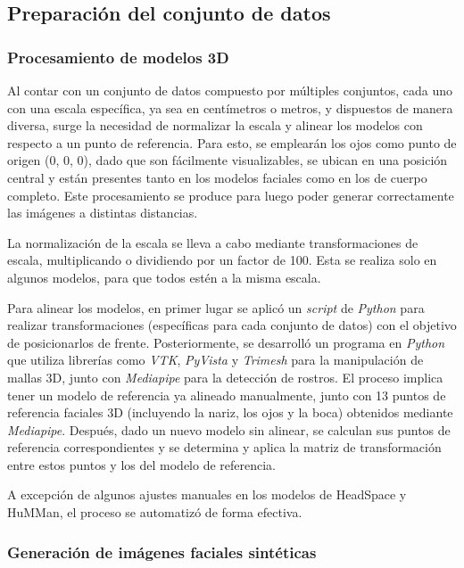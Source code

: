 \subsection{Preparación del conjunto de datos}

\subsubsection{Procesamiento de modelos 3D}

Al contar con un conjunto de datos compuesto por múltiples conjuntos, cada uno con una escala específica, ya sea en centímetros o metros, y dispuestos de manera diversa, surge la necesidad de normalizar la escala y alinear los modelos con respecto a un punto de referencia. Para esto, se emplearán los ojos como punto de origen (0, 0, 0), dado que son fácilmente visualizables, se ubican en una posición central y están presentes tanto en los modelos faciales como en los de cuerpo completo. Este procesamiento se produce para luego poder generar correctamente las imágenes a distintas distancias.

La normalización de la escala se lleva a cabo mediante transformaciones de escala, multiplicando o dividiendo por un factor de 100. Esta se realiza solo en algunos modelos, para que todos estén a la misma escala.

Para alinear los modelos, en primer lugar se aplicó un \textit{script} de \textit{Python} para realizar transformaciones (específicas para cada conjunto de datos) con el objetivo de posicionarlos de frente. Posteriormente, se desarrolló un programa en \textit{Python} que utiliza librerías como \textit{VTK}, \textit{PyVista} y \textit{Trimesh} para la manipulación de mallas 3D, junto con \textit{Mediapipe} para la detección de rostros. El proceso implica tener un modelo de referencia ya alineado manualmente, junto con 13 puntos de referencia faciales 3D (incluyendo la nariz, los ojos y la boca) obtenidos mediante \textit{Mediapipe}. Después, dado un nuevo modelo sin alinear, se calculan sus puntos de referencia correspondientes y se determina y aplica la matriz de transformación entre estos puntos y los del modelo de referencia.

A excepción de algunos ajustes manuales en los modelos de HeadSpace y HuMMan, el proceso se automatizó de forma efectiva.

\subsubsection{Generación de imágenes faciales sintéticas}

